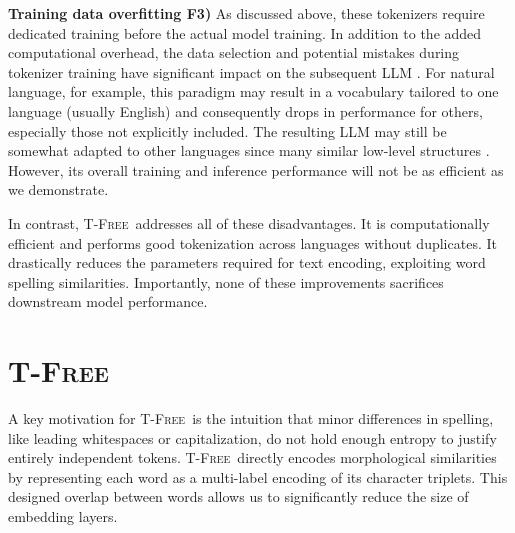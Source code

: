 \documentclass[11pt]{article}
\newcommand{\mb}[1]{\textcolor{blue}{MB: #1}}
\newcommand{\method}{\textsc{T-Free}}
\begin{document}
\textbf{Training data overfitting F3)} As discussed above, these tokenizers require dedicated training before the actual model training. In addition to the added computational overhead, the data selection and potential mistakes during tokenizer training have significant impact on the subsequent LLM \cite{ali2024tokenizer}. 
For natural language, for example, this paradigm may result in a vocabulary tailored to one language (usually English) and consequently drops in performance for others, especially those not explicitly included. 
The resulting LLM may still be somewhat adapted to other languages since many similar low-level structures \cite{nikolov2013exploiting}. However, its overall training and inference performance will not be as efficient as we demonstrate.


In contrast, \method~addresses all of these disadvantages. It is computationally efficient and performs good tokenization across languages without duplicates. It drastically reduces the parameters required for text encoding, exploiting word spelling similarities. Importantly, none of these improvements sacrifices downstream model performance.











\section{\method}
\label{sec:trigram}
A key motivation for \method~is the intuition that minor differences in spelling, like leading whitespaces or capitalization, do not hold enough entropy to justify entirely independent tokens. 
%
\method~directly encodes morphological similarities by representing each word as a multi-label encoding of its character triplets. This designed overlap between words allows us to significantly reduce the size of embedding layers.
\end{document}
